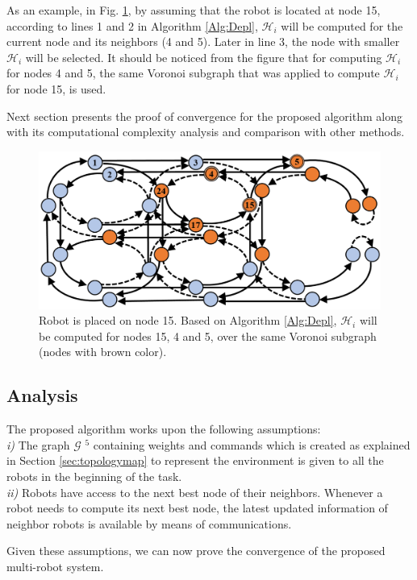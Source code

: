 \documentclass[smallcondensed]{svjour3}
\begin{document}
As an example, in Fig. \ref{fig:neighbors}, by assuming that the robot is located at node 15, according to lines 1 and 2 in Algorithm \ref{Alg:Depl}, $\mathcal{H}_i$ will be computed for the current node and its neighbors (4 and 5). Later in line 3, the node with smaller $\mathcal{H}_i$ will be selected.
%
It should be noticed from the figure that for computing $\mathcal{H}_i$ for nodes 4 and 5, the same Voronoi subgraph that was applied to compute $\mathcal H_i$ for node 15, is used. 

Next section presents the proof of convergence for the proposed algorithm along with its computational complexity analysis and comparison with other methods.
%
\begin{figure}
\centering
\includegraphics[width=0.8\columnwidth]{Figures/Fig8.png}
\caption[Voronoi subgraph.]{Robot is placed on node 15. Based on Algorithm \ref{Alg:Depl}, $\mathcal{H}_i$ will be computed for nodes 15, 4 and 5, over the same Voronoi subgraph (nodes with brown color).}
\label{fig:neighbors}
\end{figure}

\subsection{Analysis \label{sec:analysis}}

The proposed algorithm works upon the following assumptions: \\
%
\textit{i)} The graph $\mathcal G$ {\color{blue}$^5$ containing weights and commands which is created as explained in Section \ref{sec:topologymap} to represent the environment} is given to all the robots in the beginning of the task.\\
%
\textit{ii)} Robots have access to the next best node of their neighbors. Whenever a robot needs to compute its next best node, the latest updated information of neighbor robots is available by means of communications.

Given these assumptions, we can now prove the convergence of the proposed multi-robot system.
\end{document}
